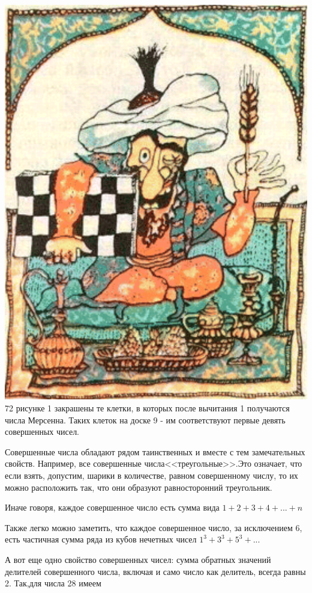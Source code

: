 \begin{multicols*}{2}
\includegraphics[width=0.99\linewidth]{./Screenshot_1.png}
72
\newline
рисунке 1 закрашены те клетки, в которых после вычитания 1 получаются числа Мерсенна. Таких клеток на доске 9 - им соответствуют первые девять совершенных чисел.\par
Совершенные числа обладают рядом таинственных и вместе с тем замечательных свойств. Например, все совершенные числа<<треугольные>>.Это означает, что если взять, допустим, шарики в количестве, равном совершенному числу, то их можно расположить так, что они образуют равносторонний треугольник.\par
Иначе говоря,  каждое совершенное число есть сумма вида $1 + 2 + 3 + 4 + ... + n$\par
Также легко можно заметить, что каждое совершенное число, за исключением 6, есть частичная сумма ряда из кубов нечетных чисел $1^3 + 3^3 + 5^3 + ...$\par
А вот еще одно свойство совершенных чисел: сумма обратных значений делителей совершенного числа, включая и само число как делитель, всегда равны 2. Так,для числа 28 имеем\\\par

\end{multicols*}

